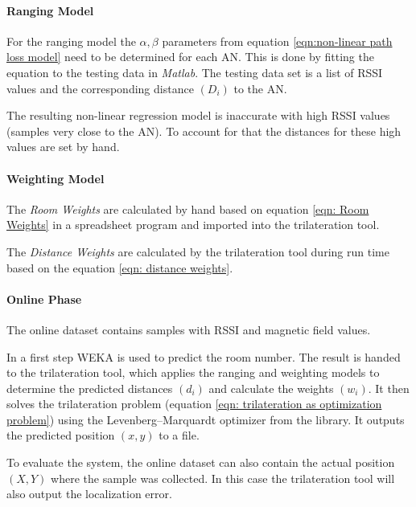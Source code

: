 \paragraph{Ranging Model}
For the ranging model the \(\alpha, \beta\) parameters from equation \ref{eqn:non-linear path loss model} need to be determined for each AN. This is done by fitting the equation to the testing data in \emph{Matlab}. The testing data set is a list of RSSI values and the corresponding distance \((D_{i})\) to the AN.

The resulting non-linear regression model is inaccurate with high RSSI values (samples very close to the AN). To account for that the distances for these high values are set by hand.

\paragraph{Weighting Model}

The \emph{Room Weights} are calculated by hand based on equation \ref{eqn: Room Weights} in a spreadsheet program and imported into the trilateration tool.

The \emph{Distance Weights} are calculated by the trilateration tool during run time based on the equation \ref{eqn: distance weights}.

\paragraph{Online Phase}

The online dataset contains samples with RSSI and magnetic field values.

In a first step WEKA is used to predict the room number. The result is handed to the trilateration tool, which applies the ranging and weighting models to determine the predicted distances \((d_{i})\) and calculate the weights \((w_{i})\). It then solves the trilateration problem (equation \ref{eqn: trilateration as optimization problem}) using the Levenberg–Marquardt optimizer from the  library. It outputs the predicted position \((x,y)\) to a  file.

To evaluate the system, the online dataset can also contain the actual position \((X,Y)\) where the sample was collected. In this case the trilateration tool will also output the localization error.
